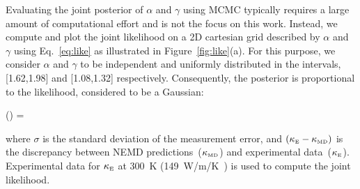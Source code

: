 Evaluating the joint posterior of $\alpha$ and $\gamma$ using MCMC typically requires a large amount of
computational effort and is not the focus on this work. Instead, we compute and plot the joint likelihood on
a 2D cartesian grid described by $\alpha$ and $\gamma$ using Eq.~\ref{eq:like} as illustrated in
Figure~\ref{fig:like}(a). For this purpose, we consider $\alpha$ and $\gamma$ to be
independent and uniformly distributed in the intervals, [1.62,1.98] and [1.08,1.32] respectively. 
Consequently, the posterior is proportional to the likelihood, considered to be a Gaussian:

\be
{}(\vert{}) = \exp{}
\label{eq:like}
\ee

\noindent where $\sigma$ is the standard deviation of the measurement error, and
$(\kappa_{\tiny{\mbox{E}}} - \kappa_{\tiny{\mbox{MD}}})$ is the discrepancy between 
NEMD predictions~($\kappa_{\tiny{\mbox{MD}}}$)
and experimental data~($\kappa_{\tiny{\mbox{E}}}$). Experimental data for $\kappa_{\tiny{\mbox{E}}}$ at 300~K
(149~W/m/K~\cite{Shanks:1963}) is used to compute the joint likelihood. 

